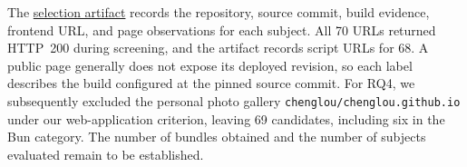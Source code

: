 The \href{https://github.com/aaronxyliu/Recall-Dataset/blob/42cbd7235c2f6c2133eebed394c989cefacba34c/selection.json}{selection artifact} records the repository, source commit, build evidence, frontend URL, and page observations for each subject. All 70 URLs returned HTTP~200 during screening, and the artifact records script URLs for 68. A public page generally does not expose its deployed revision, so each label describes the build configured at the pinned source commit. For RQ4, we subsequently excluded the personal photo gallery \texttt{chenglou/chenglou.github.io} under our web-application criterion, leaving 69 candidates, including six in the Bun category. The number of bundles obtained and the number of subjects evaluated remain to be established.
